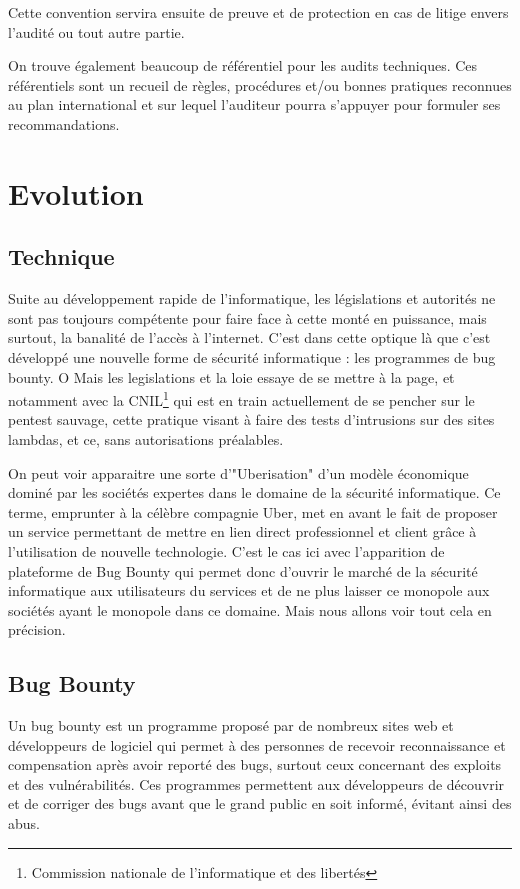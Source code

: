 \documentclass[a4paper]{memoir}
\begin{document}
Cette convention servira ensuite de preuve et de protection en cas de litige envers l'audité ou tout autre partie. 

On trouve également beaucoup de référentiel pour les audits techniques.
Ces référentiels sont un recueil de règles, procédures et/ou bonnes pratiques reconnues au plan international et sur lequel l’auditeur pourra s’appuyer pour formuler ses recommandations. 


\part{Evolution}

\chapter{Technique}

Suite au développement rapide de l'informatique, les législations et autorités ne sont pas toujours compétente pour faire face à cette monté en puissance, mais surtout, la banalité de l'accès à l'internet.
C'est dans cette optique là que c'est développé une nouvelle forme de sécurité informatique : les programmes de bug bounty. O
Mais les legislations et la loie essaye de se mettre à la page, et notamment avec la CNIL\footnote{Commission nationale de l'informatique et des libertés} qui est en train actuellement de se pencher sur le pentest sauvage, cette pratique visant à faire des tests d'intrusions sur des sites lambdas, et ce, sans autorisations préalables. 

On peut voir apparaitre une sorte d'"Uberisation" d'un modèle économique dominé par les sociétés expertes dans le domaine de la sécurité informatique. Ce terme, emprunter à la célèbre compagnie Uber, met en avant le fait de proposer un service permettant de mettre en lien direct professionnel et client grâce à l'utilisation de nouvelle technologie. C'est le cas ici avec l'apparition de plateforme de Bug Bounty qui permet donc d'ouvrir le marché de la sécurité informatique aux utilisateurs du services et de ne plus laisser ce monopole aux sociétés ayant le monopole dans ce domaine.
Mais nous allons voir tout cela en précision.

\chapter{Bug Bounty}

Un bug bounty est un programme proposé par de nombreux sites web et développeurs de logiciel qui permet à des personnes de recevoir reconnaissance et compensation après avoir reporté des bugs, surtout ceux concernant des exploits et des vulnérabilités. Ces programmes permettent aux développeurs de découvrir et de corriger des bugs avant que le grand public en soit informé, évitant ainsi des abus. 
\end{document}
